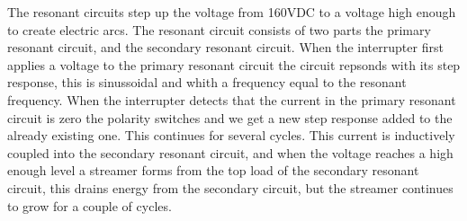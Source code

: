 The resonant circuits step up the voltage from 160VDC to a voltage high enough to create electric arcs. The resonant circuit consists of two parts the primary resonant circuit, and the secondary resonant circuit. When the interrupter first applies a voltage to the primary resonant circuit the circuit repsonds with its step response, this is sinussoidal and whith a frequency equal to the resonant frequency. When the interrupter detects that the current in the primary resonant circuit is zero the polarity switches and we get a new step response added to the already existing one. This continues for several cycles. This current is inductively coupled into the secondary resonant circuit, and when the voltage reaches a high enough level a streamer forms from the top load of the secondary resonant circuit, this drains energy from the secondary circuit, but the streamer continues to grow for a couple of cycles.


\newpage